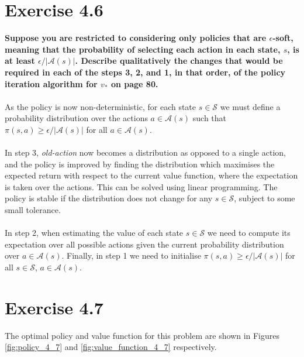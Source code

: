 \documentclass[a4paper,11pt]{article}
\numberwithin{equation}{section}
\theoremstyle{remark}
\begin{document}
\section{Exercise 4.6}

\textbf{Suppose you are restricted to considering only policies that are $\epsilon$-soft, meaning that the probability of selecting each action in each state, $s$, is at least $\epsilon/|\mathcal{A}(s)|$. Describe qualitatively the changes that would be required in each of the steps 3, 2, and 1, in that order, of the policy iteration algorithm for $v_*$ on page 80.}
\\ \\
As the policy is now non-deterministic, for each state $s \in \mathcal{S}$ we must define a probability distribution over the actions $a \in \mathcal{A}(s)$ such that $\pi(s, a) \geq \epsilon/|\mathcal{A}(s)|$ for all $a \in \mathcal{A}(s)$. 
\\ \\
In step 3, \emph{old-action} now becomes a distribution as opposed to a single action, and the policy is improved by finding the distribution which maximises the expected return with respect to the current value function, where the expectation is taken over the actions. This can be solved using linear programming. The policy is stable if the distribution does not change for any $s \in \mathcal{S}$, subject to some small tolerance.
\\ \\
In step 2, when estimating the value of each state $s \in \mathcal{S}$ we need to compute its expectation over all possible actions given the current probability distribution over $a \in \mathcal{A}(s)$. Finally, in step 1 we need to initialise $\pi(s, a) \geq \epsilon/|\mathcal{A}(s)|$ for all $s \in \mathcal{S}$, $a \in \mathcal{A}(s)$.


\section{Exercise 4.7}

The optimal policy and value function for this problem are shown in Figures \ref{fig:policy_4_7} and \ref{fig:value_function_4_7} respectively.
\end{document}
